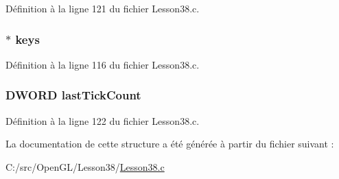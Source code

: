 Définition à la ligne 121 du fichier Lesson38.\+c.

\subsubsection[{\texorpdfstring{keys}{keys}}]{$\ast$ keys}\hypertarget{struct_g_l___window_ab7b606bf89fcfc47c79e743ba0acc6f5}{}\label{struct_g_l___window_ab7b606bf89fcfc47c79e743ba0acc6f5}


Définition à la ligne 116 du fichier Lesson38.\+c.

\subsubsection[{\texorpdfstring{last\+Tick\+Count}{lastTickCount}}]{\setlength{\rightskip}{0pt plus 5cm}D\+W\+O\+RD last\+Tick\+Count}\hypertarget{struct_g_l___window_ac8c5d2d3217a8b62132c007b62fd3e1e}{}\label{struct_g_l___window_ac8c5d2d3217a8b62132c007b62fd3e1e}


Définition à la ligne 122 du fichier Lesson38.\+c.



La documentation de cette structure a été générée à partir du fichier suivant \+:\begin{DoxyCompactItemize}
\item 
C\+:/src/\+Open\+G\+L/\+Lesson38/\hyperlink{_lesson38_8c}{Lesson38.\+c}\end{DoxyCompactItemize}
